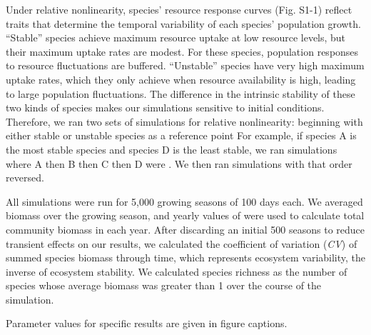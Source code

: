 \documentclass[12pt,]{article}
\begin{document}
Under relative nonlinearity, species' resource response curves (Fig.
S1-1) reflect traits that determine the temporal variability of each
species' population growth. ``Stable'' species achieve maximum resource
uptake at low resource levels, but their maximum uptake rates are
modest. For these species, population responses to resource fluctuations
are buffered. ``Unstable'' species have very high maximum uptake rates,
which they only achieve when resource availability is high, leading to
large population fluctuations. The difference in the intrinsic stability
of these two kinds of species makes our simulations sensitive to initial
conditions. Therefore, we ran two sets of simulations for relative
nonlinearity: beginning with either stable or unstable species as a
reference point For example, if species A is the most stable species and
species D is the least stable, we ran simulations where A then B then C
then D were . We then ran
simulations with that order reversed.

All simulations were run for 5,000 growing seasons of 100 days each. We
averaged biomass over the growing season, and yearly values of
 were used to calculate total community biomass
in each year. After discarding an initial 500 seasons to reduce
transient effects on our results, we calculated the coefficient of
variation (\emph{CV}) of summed species biomass through time, which
represents ecosystem variability, the inverse of ecosystem stability. We
calculated  species richness as the number of species
whose average biomass was greater than 1 over the course of the
simulation.

Parameter values for specific results are given in figure captions.
\end{document}
